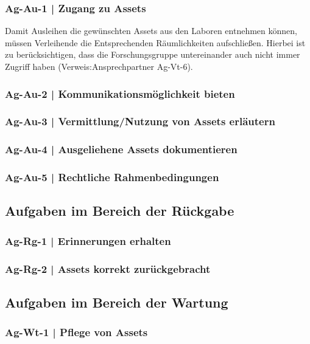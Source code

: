 \subsubsection*{Ag-Au-1 | Zugang zu Assets}
Damit Ausleihen die gewünschten Assets aus den Laboren entnehmen können, müssen Verleihende
die Entsprechenden Räumlichkeiten aufschließen. Hierbei ist zu berücksichtigen, dass die
Forschungsgruppe untereinander auch nicht immer Zugriff haben (Verweis:Ansprechpartner Ag-Vt-6).
\subsubsection*{Ag-Au-2 | Kommunikationsmöglichkeit bieten}

\subsubsection*{Ag-Au-3 | Vermittlung/Nutzung von Assets erläutern}

\subsubsection*{Ag-Au-4 | Ausgeliehene Assets dokumentieren}

\subsubsection*{Ag-Au-5 | Rechtliche Rahmenbedingungen}


\subsection*{Aufgaben im Bereich der Rückgabe}
\subsubsection*{Ag-Rg-1 | Erinnerungen erhalten}
\subsubsection*{Ag-Rg-2 | Assets korrekt zurückgebracht}

\subsection*{Aufgaben im Bereich der Wartung}
\subsubsection*{Ag-Wt-1 | Pflege von Assets}
